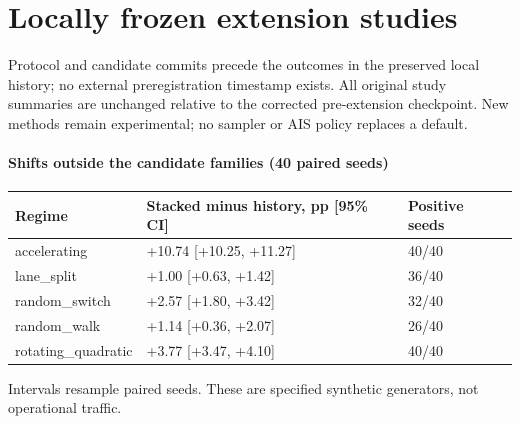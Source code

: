 \section{Locally frozen extension studies}

Protocol and candidate commits precede the outcomes in the preserved local history; no external preregistration timestamp exists. All original study summaries are unchanged relative to the corrected pre-extension checkpoint. New methods remain experimental; no sampler or AIS policy replaces a default.

\paragraph{Shifts outside the candidate families (40 paired seeds)}
\begin{center}\small\begin{tabular}{lll}
\toprule
Regime & Stacked minus history, pp [95\% CI] & Positive seeds\\\midrule
accelerating & +10.74 [+10.25, +11.27] & 40/40\\
lane\_split & +1.00 [+0.63, +1.42] & 36/40\\
random\_switch & +2.57 [+1.80, +3.42] & 32/40\\
random\_walk & +1.14 [+0.36, +2.07] & 26/40\\
rotating\_quadratic & +3.77 [+3.47, +4.10] & 40/40\\
\bottomrule\end{tabular}\end{center}

Intervals resample paired seeds. These are specified synthetic generators, not operational traffic.

